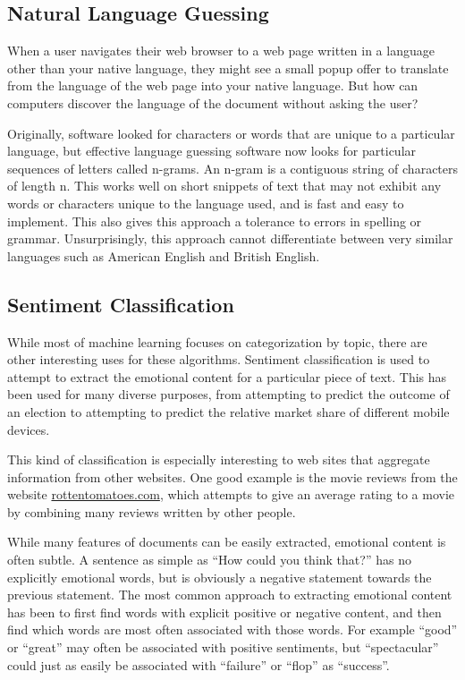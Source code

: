 \documentclass[12pt]{article}
\begin{document}
\subsection{Natural Language Guessing}
When a user navigates their web browser to a web page written in a language other than your native language,
they might see a small popup offer to translate from the language of the web page into your native
language. But how can computers discover the language of the document without asking the user?

Originally, software looked for characters or words that are unique to a particular language, but effective
language guessing software now looks for particular sequences of letters called n-grams. An n-gram is a
contiguous string of characters of length n. This works well on short snippets of text that may not exhibit
any words or characters unique to the language used, and is fast and easy to implement. This also gives this
approach a tolerance to errors in spelling or grammar. Unsurprisingly, this approach cannot differentiate
between very similar languages such as American English and British English. \citep{martins2005language}
\subsection{Sentiment Classification}
While most of machine learning focuses on categorization by topic, there are other interesting uses for these
algorithms.  Sentiment classification is used to attempt to extract the emotional content for a particular
piece of text. This has been used for many diverse purposes, from attempting to predict the outcome of an
election to attempting to predict the relative market share of different mobile devices.

This kind of classification is especially interesting to web sites that aggregate information from other
websites. One good example is the movie reviews from the website \url{rottentomatoes.com}, which attempts to
give an average rating to a movie by combining many reviews written by other people. \citep{pang2002thumbs}

While many features of documents can be easily extracted, emotional content is often subtle. A sentence as
simple as ``How could you think that?'' has no explicitly emotional words, but is obviously a negative
statement towards the previous statement. The most common approach to extracting emotional content has been to
first find words with explicit positive or negative content, and then find which words are most often
associated with those words. For example ``good'' or ``great'' may often be associated with positive
sentiments, but ``spectacular'' could just as easily be associated with ``failure'' or ``flop'' as
``success''.
\end{document}
